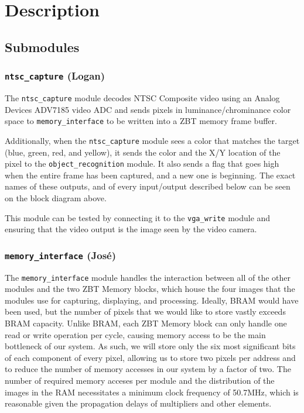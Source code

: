 \documentclass[10pt]{article}
\begin{document}
\section{Description}

\subsection{Submodules}

\subsubsection{{\tt ntsc\_capture} (Logan)}
The {\tt ntsc\_capture} module decodes NTSC Composite video using an Analog Devices ADV7185 video ADC and sends pixels in luminance/chrominance color space to {\tt memory\_interface} to be written into a ZBT memory frame buffer.

Additionally, when the {\tt ntsc\_capture} module sees a color that matches the target (blue, green, red, and yellow), it sends the color and the X/Y location of the pixel to the {\tt object\_recognition} module. It also sends a flag that goes high when the entire frame has been captured, and a new one is beginning. The exact names of these outputs, and of every input/output described below can be seen on the block diagram above.

This module can be tested by connecting it to the {\tt vga\_write} module and ensuring that the video output is the image seen by the video camera.

\subsubsection{{\tt memory\_interface} (Jos\'{e})}
The {\tt memory\_interface} module handles the interaction between all of the other modules and the two ZBT Memory blocks, which house the four images that the modules use for capturing, displaying, and processing. Ideally, BRAM would have been used, but the number of pixels that we would like to store vastly exceeds BRAM capacity. Unlike BRAM, each ZBT Memory block can only handle one read or write operation per cycle, causing memory access to be the main bottleneck of our system. As such, we will store only the six most significant bits of each component of every pixel, allowing us to store two pixels per address and to reduce the number of memory accesses in our system by a factor of two. The number of required memory acceses per module and the distribution of the images in the RAM necessitates a minimum clock frequency of 50.7MHz, which is reasonable given the propagation delays of multipliers and other elements.
\end{document}
